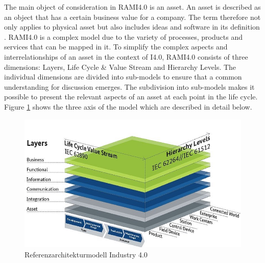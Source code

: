 The main object of consideration in \ac{RAMI4.0} is an asset. An asset is described as an object that has a certain business value for a company. The term therefore not only applies to physical asset but also includes ideas and software in its definition \cite[p. 31]{Heidel2017ReferenzarchitekturmodellIndustrie4.0Komponente}. \ac{RAMI4.0} is a complex model due to the variety of processes, products and services that can be mapped in it. To simplify the complex aspects and interrelationships of an asset in the context of \ac{I4.0}, \ac{RAMI4.0} consists of three dimensions: Layers, Life Cycle \& Value Stream and Hierarchy Levels. The individual dimensions are divided into sub-models to ensure that a common understanding for discussion emerges. The subdivision into sub-models makes it possible to present the relevant aspects of an asset at each point in the life cycle. Figure \ref{fig:rami40} shows the three axis of the model which are described in detail below.

\begin{figure}[h]
\includegraphics[scale=0.5]{content/pictures/rami_4.0_zvei.jpg}
\caption{Referenzarchitekturmodell Industry 4.0}
\label{fig:rami40}
\end{figure}


